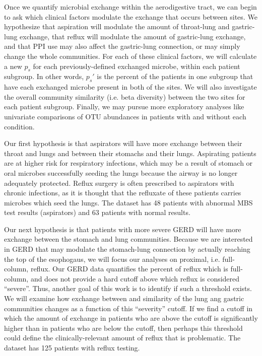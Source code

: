 \documentclass[12pt]{article}
\begin{document}
Once we quantify microbial exchange within the aerodigestive tract, we 
can begin to ask which clinical factors modulate the exchange 
that occurs between sites. We hypothesize that aspiration will modulate the 
amount of throat-lung and gastric-lung exchange, that reflux will modulate 
the amount of gastric-lung exchange, and that PPI use may also affect
the gastric-lung connection, or may simply change the whole communities.
For each of these clinical factors, we will calculate a new $p_s$ for 
each previously-defined exchanged microbe, within each patient subgroup.
In other words, $p_s'$ is the percent of the patients in one subgroup
that have each exchanged microbe present in both of the sites.
We will also investigate the overall community similarity (i.e. beta diversity) 
between the two sites for each patient subgroup. Finally, we may pursue
more exploratory analyses like univariate comparisons of OTU abundances
in patients with and without each condition.


Our first hypothesis is that aspirators will have more exchange between their throat and lungs and between their stomachs and their lungs.
Aspirating patients are at higher risk for respiratory infections, which
may be a result of stomach or oral microbes successfully seeding the lungs
because the airway is no longer adequately protected.
Reflux surgery is often prescribed to aspirators with chronic infections,
as it is thought that the refluxate of these patients carries microbes which seed the lungs. 
The dataset has 48 patients with abnormal MBS test results (aspirators) and 63 patients with normal results.

Our next hypothesis is that patients with more severe GERD will have 
more exchange between the stomach and lung communities. Because we are 
interested in GERD that may modulate the stomach-lung connection by
actually reaching the top of the esophogaus, we will focus our analyses
on proximal, i.e. full-column, reflux. Our GERD data quantifies the
percent of reflux which is full-column, and does not provide a hard
cutoff above which reflux is considered ``severe''. Thus, another goal
of this work is to identify if such a threshold exists. We will examine
how exchange between and similarity of the lung ang gastric communities
changes as a function of this ``severity'' cutoff. If we find a cutoff
in which the amount of exchange in patients who are above the cutoff is 
significantly higher than in patients who are below the cutoff, then perhaps
this threshold could define the clinically-relevant amount of reflux that is
problematic. The dataset has 125 patients with reflux testing.
\end{document}
